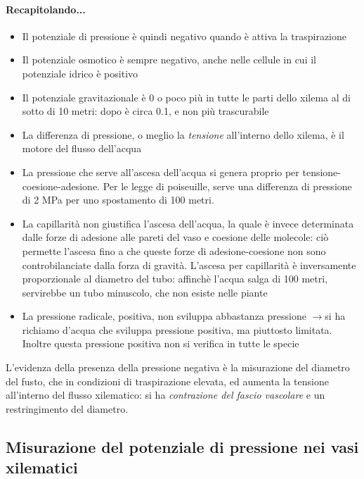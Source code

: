 \documentclass[a4paper,12pt]{book}
\newcommand{\lfreccia}{\ensuremath{\longrightarrow}}
\begin{document}
\paragraph{Recapitolando...}
\begin{itemize}
\item{Il potenziale di pressione è quindi negativo quando  è attiva la traspirazione}
\item{Il potenziale osmotico è sempre negativo, anche nelle cellule in cui il potenziale idrico è positivo}
\item{Il potenziale gravitazionale è 0 o poco più in tutte le parti dello xilema al di sotto di 10 metri: dopo è circa 0.1, e non più trascurabile}
\item{La differenza di pressione, o meglio la \emph{tensione} all'interno dello xilema, è il motore del flusso dell'acqua}
\item{La pressione che serve all'ascesa dell'acqua si genera proprio per tensione-coesione-adesione. Per le legge di poiseuille, serve una differenza di pressione di 2 MPa per uno spostamento di 100 metri.}
\item{La capillarità non giustifica l'ascesa dell'acqua, la quale  è invece determinata dalle forze di adesione alle pareti del vaso e coesione delle molecole: ciò permette l'ascesa fino a che queste forze di adesione-coesione non sono controbilanciate dalla forza di gravità. L'ascesa per capillarità è inversamente proporzionale al diametro del tubo: affinchè l'acqua salga di 100 metri, servirebbe un tubo minuscolo, che non esiste nelle piante}
\item{La pressione radicale, positiva, non sviluppa abbastanza pressione \lfreccia si ha richiamo d'acqua che sviluppa pressione positiva, ma piuttosto limitata. Inoltre questa pressione positiva non si verifica in tutte le specie}
\end{itemize}

L'evidenza della presenza della pressione negativa è la misurazione del diametro del fusto, che in condizioni di traspirazione elevata, ed aumenta la tensione all'interno del flusso xilematico: si ha \emph{contrazione del fascio vascolare} e un restringimento del diametro. 

\subsection{Misurazione del potenziale di pressione nei vasi xilematici}
\end{document}
